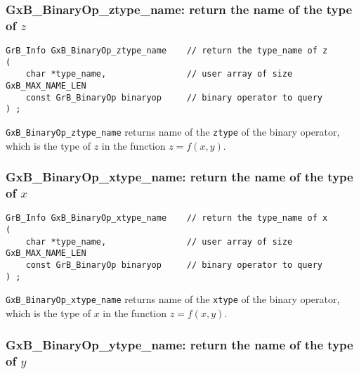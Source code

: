 \documentclass[12pt]{article}
\begin{document}
\subsubsection{{\sf GxB\_BinaryOp\_ztype\_name:} return the name of the type of $z$}
\label{binaryop_ztype_name}

\begin{mdframed}[userdefinedwidth=6in]
{\footnotesize
\begin{verbatim}
GrB_Info GxB_BinaryOp_ztype_name    // return the type_name of z
(
    char *type_name,                // user array of size GxB_MAX_NAME_LEN
    const GrB_BinaryOp binaryop     // binary operator to query
) ;
\end{verbatim}
} \end{mdframed}

\verb'GxB_BinaryOp_ztype_name'
returns name of the \verb'ztype' of the binary operator, which is the
type of $z$ in the function $z=f(x,y)$.

\subsubsection{{\sf GxB\_BinaryOp\_xtype\_name:} return the name of the type of $x$}
\label{binaryop_xtype_name}

\begin{mdframed}[userdefinedwidth=6in]
{\footnotesize
\begin{verbatim}
GrB_Info GxB_BinaryOp_xtype_name    // return the type_name of x
(
    char *type_name,                // user array of size GxB_MAX_NAME_LEN
    const GrB_BinaryOp binaryop     // binary operator to query
) ;
\end{verbatim}
}\end{mdframed}

\verb'GxB_BinaryOp_xtype_name'
returns name of the \verb'xtype' of the binary operator, which is the
type of $x$ in the function $z=f(x,y)$.

\newpage
\subsubsection{{\sf GxB\_BinaryOp\_ytype\_name:} return the name of the type of $y$}
\label{binaryop_ytype_name}
\end{document}
